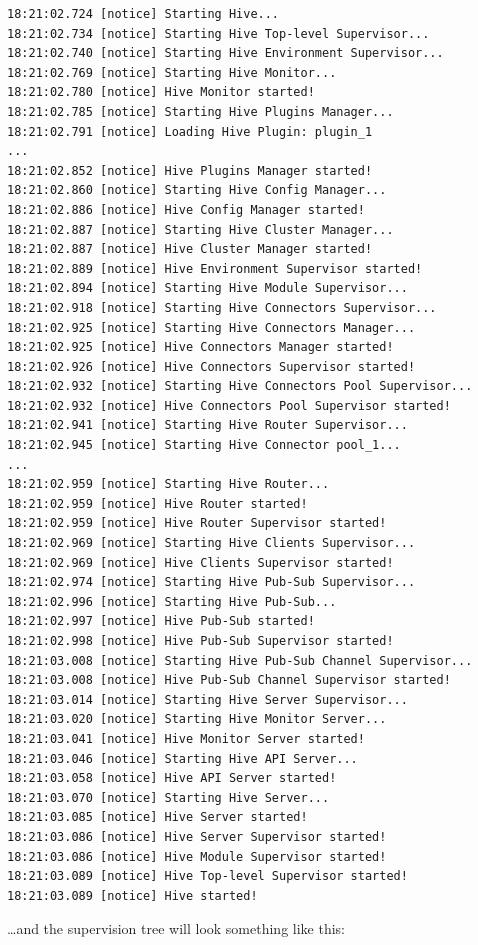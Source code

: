 \documentclass[a4paper]{article}
\begin{document}
\begin{verbatim}
18:21:02.724 [notice] Starting Hive...
18:21:02.734 [notice] Starting Hive Top-level Supervisor...
18:21:02.740 [notice] Starting Hive Environment Supervisor...
18:21:02.769 [notice] Starting Hive Monitor...
18:21:02.780 [notice] Hive Monitor started!
18:21:02.785 [notice] Starting Hive Plugins Manager...
18:21:02.791 [notice] Loading Hive Plugin: plugin_1
...
18:21:02.852 [notice] Hive Plugins Manager started!
18:21:02.860 [notice] Starting Hive Config Manager...
18:21:02.886 [notice] Hive Config Manager started!
18:21:02.887 [notice] Starting Hive Cluster Manager...
18:21:02.887 [notice] Hive Cluster Manager started!
18:21:02.889 [notice] Hive Environment Supervisor started!
18:21:02.894 [notice] Starting Hive Module Supervisor...
18:21:02.918 [notice] Starting Hive Connectors Supervisor...
18:21:02.925 [notice] Starting Hive Connectors Manager...
18:21:02.925 [notice] Hive Connectors Manager started!
18:21:02.926 [notice] Hive Connectors Supervisor started!
18:21:02.932 [notice] Starting Hive Connectors Pool Supervisor...
18:21:02.932 [notice] Hive Connectors Pool Supervisor started!
18:21:02.941 [notice] Starting Hive Router Supervisor...
18:21:02.945 [notice] Starting Hive Connector pool_1...
...
18:21:02.959 [notice] Starting Hive Router...
18:21:02.959 [notice] Hive Router started!
18:21:02.959 [notice] Hive Router Supervisor started!
18:21:02.969 [notice] Starting Hive Clients Supervisor...
18:21:02.969 [notice] Hive Clients Supervisor started!
18:21:02.974 [notice] Starting Hive Pub-Sub Supervisor...
18:21:02.996 [notice] Starting Hive Pub-Sub...
18:21:02.997 [notice] Hive Pub-Sub started!
18:21:02.998 [notice] Hive Pub-Sub Supervisor started!
18:21:03.008 [notice] Starting Hive Pub-Sub Channel Supervisor...
18:21:03.008 [notice] Hive Pub-Sub Channel Supervisor started!
18:21:03.014 [notice] Starting Hive Server Supervisor...
18:21:03.020 [notice] Starting Hive Monitor Server...
18:21:03.041 [notice] Hive Monitor Server started!
18:21:03.046 [notice] Starting Hive API Server...
18:21:03.058 [notice] Hive API Server started!
18:21:03.070 [notice] Starting Hive Server...
18:21:03.085 [notice] Hive Server started!
18:21:03.086 [notice] Hive Server Supervisor started!
18:21:03.086 [notice] Hive Module Supervisor started!
18:21:03.089 [notice] Hive Top-level Supervisor started!
18:21:03.089 [notice] Hive started!
\end{verbatim}



\noindent
\ldots{}and the supervision tree will look something like this:
\end{document}
